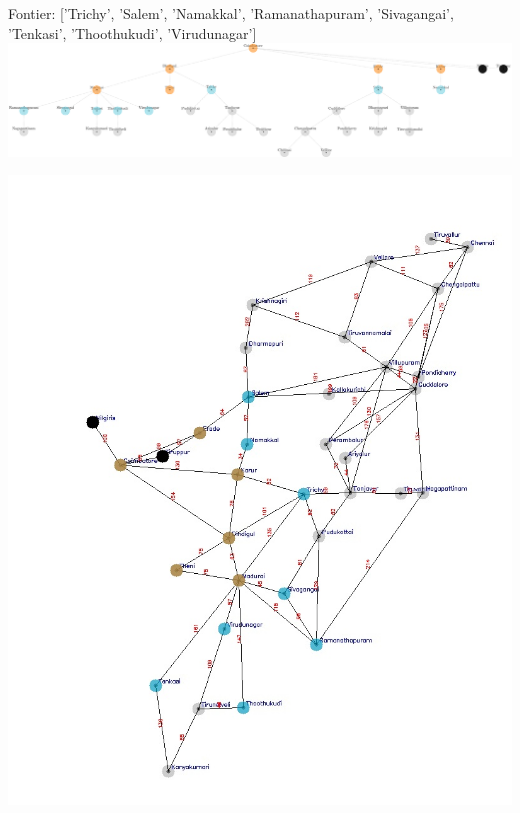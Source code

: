 \documentclass[xcolor=table]{beamer}
\begin{document}
\begin{frame}
  { \tiny Fontier: ['Trichy', 'Salem', 'Namakkal', 'Ramanathapuram', 'Sivagangai', 'Tenkasi', 'Thoothukudi', 'Virudunagar'] }
  \includegraphics[width=1\textwidth]{../BFSNodes/12-1.png}
  \begin{center}
    \includegraphics[height=0.6\textheight]{../BFSoutput/tamilBFS10.jpg}
  \end{center}
\end{frame}
\end{document}
